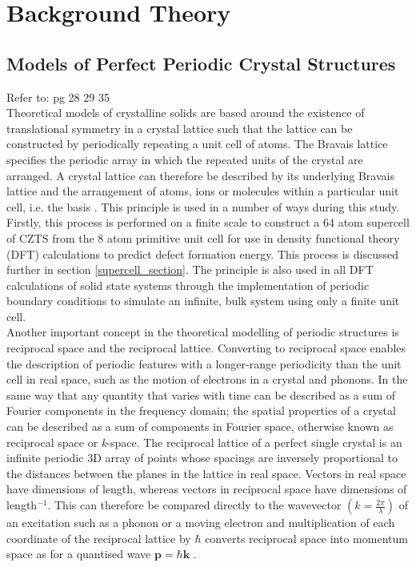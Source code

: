 
\chapter{Background Theory}

\label{ch:background}

\section{Models of Perfect Periodic Crystal Structures}
Refer to: pg 28 29 35 \cite{thin_film_Boer}\\

Theoretical models of crystalline solids are based around the existence of translational symmetry in a crystal lattice such that the lattice can be constructed by periodically repeating a unit cell of atoms. The Bravais lattice specifies the periodic array in which the repeated units of the crystal are arranged. A crystal lattice can therefore be described by its underlying Bravais lattice and the arrangement of atoms, ions or molecules within a particular unit cell, i.e. the basis \cite{AshcroftMermin2}. This principle is used in a number of ways during this study. Firstly, this process is performed on a finite scale to construct a 64 atom supercell of CZTS from the 8 atom primitive unit cell for use in density functional theory (DFT) calculations to predict defect formation energy. This process is discussed further in section \ref{supercell_section}. The principle is also used in all DFT calculations of solid state systems through the implementation of periodic boundary conditions to simulate an infinite, bulk system using only a finite unit cell.\\
 
Another important concept in the theoretical modelling of periodic structures is reciprocal space and the reciprocal lattice. 
Converting to reciprocal space enables the description of periodic features with a longer-range periodicity than the unit cell in real space, such as the motion of electrons in a crystal and phonons.
In the same way that any quantity that varies with time can be described as a sum of Fourier components in the frequency domain; the spatial properties of a crystal can be described as a sum of components in Fourier space, otherwise known as reciprocal space or \textit{k}-space. The reciprocal lattice of a perfect single crystal is an infinite periodic 3D array of points whose spacings are inversely proportional to the distances between the planes in the lattice in real space. Vectors in real space have dimensions of length, whereas vectors in reciprocal space have dimensions of length$^{-1}$. This can therefore be compared directly to the wavevector $ \left(k  = \frac{2\pi}{\lambda} \right)$ of an excitation such as a phonon or a moving electron and multiplication of each coordinate of the reciprocal lattice by $\hbar$ converts reciprocal space into momentum space as for a quantised wave $\mathbf{p} = \hbar \mathbf{k}$ \cite{Blakemore1}. \\ 

